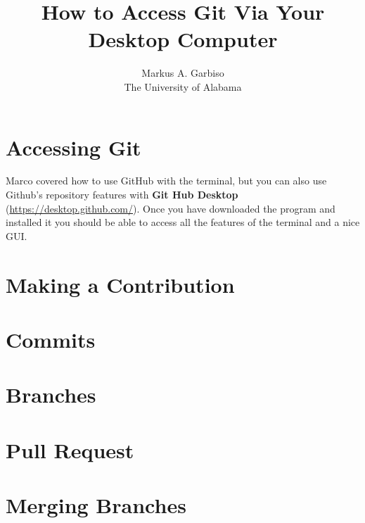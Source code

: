 \documentclass{article}
\title{How to Access Git Via Your Desktop Computer} %
\author{Markus A. Garbiso \\ The University of Alabama} %
\begin{document}
\maketitle

\section{Accessing Git}

Marco covered how to use GitHub with the terminal, but you can also use Github's repository features with \textbf{Git Hub Desktop} (\href{https://desktop.github.com/}{https://desktop.github.com/}). Once you have downloaded the program and installed it you should be able to access all the features of the terminal and a nice GUI.

\section{Making a Contribution}

\section{Commits}

\section{Branches}

\section{Pull Request}

\section{Merging Branches}
\end{document}
